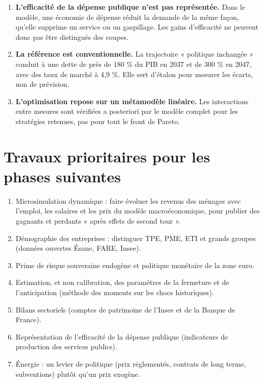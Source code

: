 \begin{enumerate}
modèle se comporte de façon cohérente après un choc d'offre. Les résultats de long terme des mesures qui modifient le
potentiel en dépendent.
\item \textbf{L'efficacité de la dépense publique n'est pas représentée.} Dans le modèle, une économie de dépense
réduit la demande de la même façon, qu'elle supprime un service ou un gaspillage. Les gains d'efficacité ne peuvent
donc pas être distingués des coupes.
\item \textbf{La référence est conventionnelle.} La trajectoire « politique inchangée » conduit à une dette de près de
180 \% du PIB en 2037 et de 300 \% en 2047, avec des taux de marché à 4,9 \%. Elle sert d'étalon pour mesurer les
écarts, non de prévision.
\item \textbf{L'optimisation repose sur un métamodèle linéaire.} Les interactions entre mesures sont vérifiées a
posteriori par le modèle complet pour les stratégies retenues, pas pour tout le front de Pareto.
\end{enumerate}

\section{Travaux prioritaires pour les phases suivantes}

\begin{enumerate}
\item Microsimulation dynamique : faire évoluer les revenus des ménages avec l'emploi, les salaires et les prix du
modèle macroéconomique, pour publier des gagnants et perdants « après effets de second tour ».
\item Démographie des entreprises : distinguer TPE, PME, ETI et grands groupes (données ouvertes Ésane, FARE,
Insee).
\item Prime de risque souveraine endogène et politique monétaire de la zone euro.
\item Estimation, et non calibration, des paramètres de la fermeture et de l'anticipation (méthode des moments sur
les chocs historiques).
\item Bilans sectoriels (comptes de patrimoine de l'Insee et de la Banque de France).
\item Représentation de l'efficacité de la dépense publique (indicateurs de production des services publics).
\item Énergie : un levier de politique (prix réglementés, contrats de long terme, subventions) plutôt qu'un prix
exogène.
\end{enumerate}
